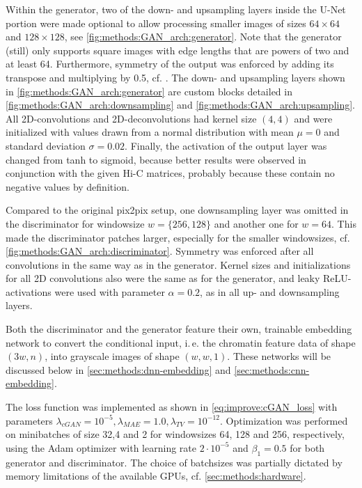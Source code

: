 Within the generator, two of the down- and upsampling layers inside the U-Net portion were made optional 
to allow processing smaller images of sizes $64\times64$ and $128\times128$, see \cref{fig:methods:GAN_arch:generator}.
Note that the generator (still) only supports square images with edge lengths that are powers of two and at least 64.
Furthermore, symmetry of the output was enforced by adding its transpose and multiplying by 0.5, cf. \cite{Fudenberg2020}.
The down- and upsampling layers shown in  \cref{fig:methods:GAN_arch:generator} are custom blocks 
detailed in \cref{fig:methods:GAN_arch:downsampling} and \ref{fig:methods:GAN_arch:upsampling}. 
All 2D-convolutions and 2D-deconvolutions had kernel size $(4,4)$ and were initialized with values drawn from a normal distribution with mean $\mu=0$ and
standard deviation $\sigma=0.02$.
Finally, the activation of the output layer was changed from tanh to sigmoid, because better results were observed
in conjunction with the given Hi-C matrices, probably because these contain no negative values by definition.

Compared to the original pix2pix setup, 
one downsampling layer was omitted in the discriminator for windowsize $w=\{256,128\}$ and another one for $w=64$.
This made the discriminator patches larger, especially for the smaller windowsizes,
cf. \cref{fig:methods:GAN_arch:discriminator}.
Symmetry was enforced after all convolutions in the same way as in the generator.
Kernel sizes and initializations for all 2D convolutions also were the same as for the generator,
and leaky ReLU-activations were used with parameter $\alpha=0.2$, as in all up- and downsampling layers.

Both the discriminator and the generator feature their own, trainable embedding network
to convert the conditional input, i.\,e. the chromatin feature data of shape $(3w, n)$,
into grayscale images of shape $(w,w,1)$. 
These networks will be discussed below in \cref{sec:methods:dnn-embedding}
and \cref{sec:methods:cnn-embedding}.

The loss function was implemented as shown in \cref{eq:improve:cGAN_loss}
with parameters $\lambda_\mathit{cGAN}=10^{-5}, \lambda_\mathit{MAE}=1.0, \lambda_\mathit{TV}=10^{-12}$.
Optimization was performed on minibatches of size 32,4 and 2 for windowsizes 64, 128 and 256, respectively, 
using the Adam optimizer with learning rate $2\cdot10^{-5}$ and $\beta_1=0.5$ for both generator and discriminator.
The choice of batchsizes was partially dictated by memory limitations of the available GPUs, cf. \cref{sec:methods:hardware}.

